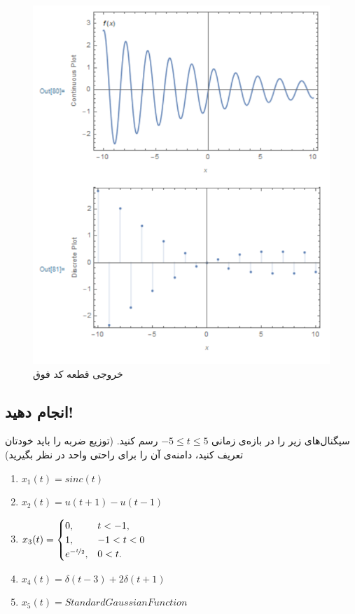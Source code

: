 \documentclass{utsignal}
\begin{document}
	\begin{figure}[h]
		\centering
		\includegraphics[height=0.4\textheight,keepaspectratio]{mathplot.png}
		\caption{خروجی قطعه کد فوق}
	\end{figure}
	
	\subsection{انجام دهید!}
	سیگنال‌های زیر را در بازه‌ی زمانی $-5 \le t \le 5$ رسم کنید. (توزیع ضربه را باید خودتان تعریف کنید، دامنه‌ی آن را برای راحتی واحد در نظر بگیرید)
	\begin{latin}
		\begin{flushleft}
			\begin{enumerate}
				\item $x_1(t) = sinc(t)$
				\item $x_2(t) = u(t+1) - u(t-1)$
				\item $x_3(t) = \begin{cases}
									0, & t < -1,\\
									1, & -1 < t < 0\\
									e^{-\nicefrac{t}{2}}, & 0 < t.
								\end{cases}$
				\item $x_4(t) = \delta(t-3) + 2\delta(t+1)$
				\item $x_5(t) = Standard Gaussian Function$
			\end{enumerate}
		\end{flushleft}
	\end{latin}
\end{document}
